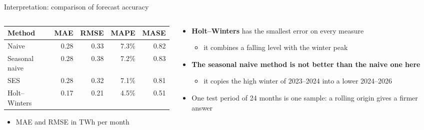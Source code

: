 \begin{frame}{Interpretation: comparison of forecast accuracy}
\itemsize{\footnotesize}
\begin{columns}[T]
\begin{column}{0.50\textwidth}
\begin{center}
\scriptsize
\begin{tabular}{lrrrr}
\toprule
\textbf{Method} & MAE & RMSE & MAPE & MASE \\
\midrule
Naive & 0.28 & 0.33 & 7.3\% & 0.82 \\
Seasonal naive & 0.28 & 0.38 & 7.2\% & 0.83 \\
SES & 0.28 & 0.32 & 7.1\% & 0.81 \\
Holt--Winters & 0.17 & 0.21 & 4.5\% & 0.51 \\
\bottomrule
\end{tabular}
\end{center}
\begin{itemize}
    \item MAE and RMSE in TWh per month
\end{itemize}
\end{column}
\begin{column}{0.46\textwidth}
\begin{itemize}
    \item \textbf{Holt--Winters} has the smallest error on every measure
    \begin{itemize}
        \item it combines a falling level with the winter peak
    \end{itemize}
    \item \textbf{The seasonal naive method is not better than the naive one here}
    \begin{itemize}
        \item it copies the high winter of 2023--2024 into a lower 2024--2026
    \end{itemize}
    \item One test period of 24 months is one sample: a rolling origin gives a firmer answer
\end{itemize}
\end{column}
\end{columns}
\end{frame}

